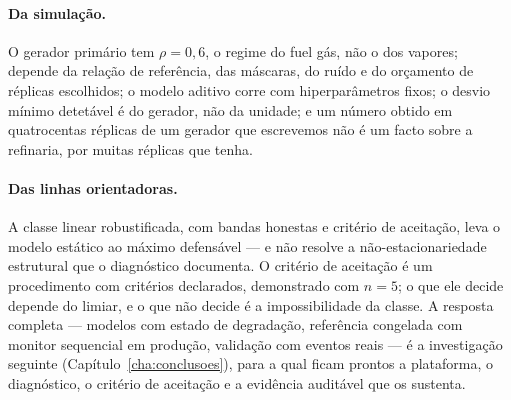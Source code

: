 \paragraph{Da simulação.} O gerador primário tem $\rho = 0{,}6$, o regime do
fuel gás, não o dos vapores; depende da relação de referência, das
máscaras, do ruído e do orçamento de réplicas escolhidos; o modelo aditivo
corre com hiperparâmetros fixos; o desvio mínimo detetável é do gerador, não
da unidade; e um número obtido em quatrocentas réplicas de um gerador que
escrevemos não é um facto sobre a refinaria, por muitas réplicas que tenha.

\paragraph{Das linhas orientadoras.} A classe linear robustificada, com
bandas honestas e critério de aceitação, leva o modelo estático ao máximo
defensável --- e não resolve a não-estacionariedade estrutural que o
diagnóstico documenta. O critério de aceitação é um procedimento com
critérios declarados, demonstrado com $n = 5$; o que ele decide depende do
limiar, e o que não decide é a impossibilidade da classe. A resposta
completa --- modelos com estado de degradação, referência congelada com
monitor sequencial em produção, validação com eventos reais --- é a
investigação seguinte (Capítulo~\ref{cha:conclusoes}), para a qual ficam
prontos a plataforma, o diagnóstico, o critério de aceitação e a evidência
auditável que os sustenta.

